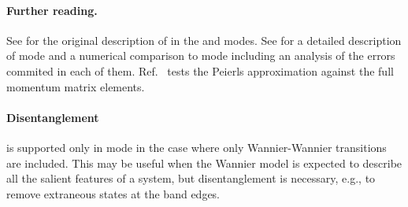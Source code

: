 \paragraph{Further reading.} See \cite{Philipp} for the original
description of \woptic in the  and  modes.
See \cite{Elias} for a detailed description of  mode and
a numerical comparison to  mode including an analysis of
the errors commited in each of them.  Ref.~\cite{Wissgott2012} tests the
Peierls approximation against the full momentum matrix elements.

\paragraph{\lvir Disentanglement} is supported only in 
mode in the case where only Wannier-Wannier transitions are included.
This may be useful when the Wannier model is expected to describe all
the salient features of a system, but disentanglement is necessary,
e.g., to remove extraneous states at the band edges.


